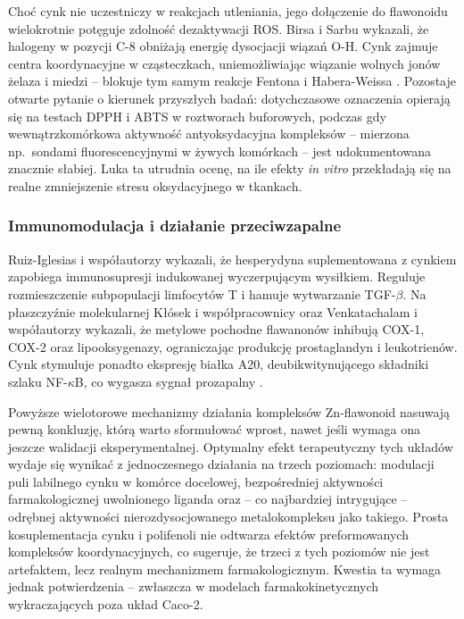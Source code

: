 \documentclass[12pt,a4paper]{article}
\begin{document}
Choć cynk nie uczestniczy w reakcjach utleniania, jego dołączenie do flawonoidu wielokrotnie potęguje zdolność dezaktywacji ROS. Birsa i Sarbu \cite{birsa2024a, birsa2024b} wykazali, że halogeny w pozycji C-8 obniżają energię dysocjacji wiązań O-H. Cynk zajmuje centra koordynacyjne w cząsteczkach, uniemożliwiając wiązanie wolnych jonów żelaza i miedzi -- blokuje tym samym reakcje Fentona i Habera-Weissa \cite{santos2020, maret2019}. Pozostaje otwarte pytanie o kierunek przyszłych badań: dotychczasowe oznaczenia opierają się na testach DPPH i ABTS w roztworach buforowych, podczas gdy wewnątrzkomórkowa aktywność antyoksydacyjna kompleksów -- mierzona np.\ sondami fluorescencyjnymi w żywych komórkach -- jest udokumentowana znacznie słabiej. Luka ta utrudnia ocenę, na ile efekty \textit{in vitro} przekładają się na realne zmniejszenie stresu oksydacyjnego w tkankach.

\subsubsection{Immunomodulacja i działanie przeciwzapalne}

Ruiz-Iglesias i współautorzy \cite{ruiz2020} wykazali, że hesperydyna suplementowana z cynkiem zapobiega immunosupresji indukowanej wyczerpującym wysiłkiem. Reguluje rozmieszczenie subpopulacji limfocytów T i hamuje wytwarzanie TGF-$\beta$. Na płaszczyźnie molekularnej Kłósek i współpracownicy \cite{klosek2023} oraz Venkatachalam i współautorzy \cite{venkatachalam2022} wykazali, że metylowe pochodne flawanonów inhibują COX-1, COX-2 oraz lipooksygenazy, ograniczając produkcję prostaglandyn i leukotrienów. Cynk stymuluje ponadto ekspresję białka A20, deubikwitynującego składniki szlaku NF-$\kappa$B, co wygasza sygnał prozapalny \cite{klosek2023}.

Powyższe wielotorowe mechanizmy działania kompleksów Zn-flawonoid nasuwają pewną konkluzję, którą warto sformułować wprost, nawet jeśli wymaga ona jeszcze walidacji eksperymentalnej. Optymalny efekt terapeutyczny tych układów wydaje się wynikać z jednoczesnego działania na trzech poziomach: modulacji puli labilnego cynku w komórce docelowej, bezpośredniej aktywności farmakologicznej uwolnionego liganda oraz -- co najbardziej intrygujące -- odrębnej aktywności nierozdysocjowanego metalokompleksu jako takiego. Prosta kosuplementacja cynku i polifenoli nie odtwarza efektów preformowanych kompleksów koordynacyjnych, co sugeruje, że trzeci z tych poziomów nie jest artefaktem, lecz realnym mechanizmem farmakologicznym. Kwestia ta wymaga jednak potwierdzenia -- zwłaszcza w modelach farmakokinetycznych wykraczających poza układ Caco-2.
\end{document}
